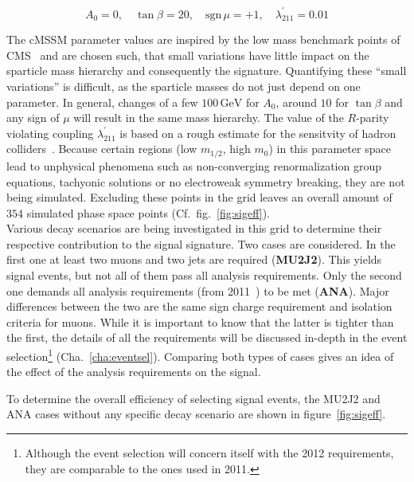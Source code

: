 \begin{equation*}
  A_0 = 0, \quad \tan{\beta} = 20, \quad \text{sgn}\,\mu = +1, \quad \lambda^\prime_{211} = 0.01
\end{equation*}

The cMSSM parameter values are inspired by the low mass benchmark points of CMS~\cite{cmssusybenchmarkpoints} and are chosen such, that small variations have little impact on the sparticle mass hierarchy and consequently the signature. Quantifying these ``small variations'' is difficult, as the sparticle masses do not just depend on one parameter. In general, changes of a few $100\,\text{GeV}$ for $A_0$, around $10$ for $\tan{\beta}$ and any sign of $\mu$ will result in the same mass hierarchy. The value of the $R$-parity violating coupling $\lambda^\prime_{211}$ is based on a rough estimate for the sensitvity of hadron colliders~\cite{rpvimpl}. Because certain regions (low $m_{1/2}$, high $m_0$) in this parameter space lead to unphysical phenomena such as non-converging renormalization group equations, tachyonic solutions or no electroweak symmetry breaking, they are not being simulated. Excluding these points in the grid leaves an overall amount of $354$ simulated phase space points (Cf.~fig.~\ref{fig:sigeff}). \\

Various decay scenarios are being investigated in this grid to determine their respective contribution to the signal signature. Two cases are considered. In the first one at least two muons and two jets are required (\textbf{MU2J2}). This yields signal events, but not all of them pass all analysis requirements. Only the second one demands all analysis requirements (from 2011~\cite{2011rpv}) to be met (\textbf{ANA}). Major differences between the two are the same sign charge requirement and isolation criteria for muons. While it is important to know that the latter is tighter than the first, the details of all the requirements will be discussed in-depth in the event selection\footnote{Although the event selection will concern itself with the 2012 requirements, they are comparable to the ones used in 2011.} (Cha.~\ref{cha:eventsel}). Comparing both types of cases gives an idea of the effect of the analysis requirements on the signal.

To determine the overall efficiency of selecting signal events, the MU2J2 and ANA cases without any specific decay scenario are shown in figure~\ref{fig:sigeff}.

